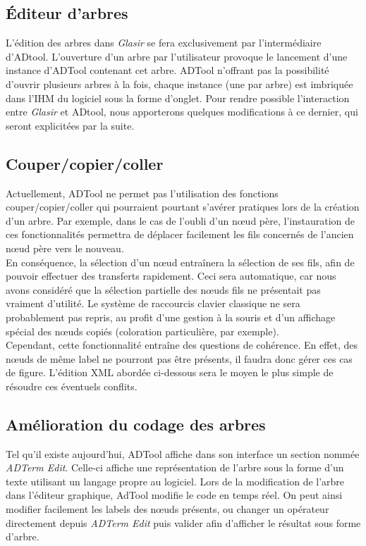 	\subsection{Éditeur d'arbres}

	L'édition des arbres dans \emph{Glasir} se fera exclusivement par l'intermédiaire d'ADtool. L'ouverture d'un arbre par l'utilisateur provoque le lancement d'une instance d'ADTool contenant cet arbre. ADTool n'offrant pas la possibilité d'ouvrir plusieurs arbres à la fois, chaque instance (une par arbre) est imbriquée dans l'IHM du logiciel sous la forme d'onglet. Pour rendre possible l'interaction entre \emph{Glasir} et ADtool, nous apporterons quelques modifications à ce dernier, qui seront explicitées par la suite.

\subsection{Couper/copier/coller}
	
	Actuellement, ADTool ne permet pas l'utilisation des fonctions couper/copier/coller qui pourraient pourtant s'avérer pratiques lors de la création d'un arbre. Par exemple, dans le cas de l'oubli d'un nœud père, l'instauration de ces fonctionnalités permettra de déplacer facilement les fils concernés de l'ancien nœud père vers le nouveau.\\
	En conséquence, la sélection d'un nœud entraînera la sélection de ses fils, afin de pouvoir effectuer des transferts rapidement. Ceci sera automatique, car nous avons considéré que la sélection partielle des nœuds fils ne présentait pas vraiment d'utilité. Le système de raccourcis clavier classique ne sera probablement pas repris, au profit d'une gestion à la souris et d'un affichage spécial des nœuds copiés (coloration particulière, par exemple).\\

	Cependant, cette fonctionnalité entraîne des questions de cohérence. En effet, des nœuds de même label ne pourront pas être présents, il faudra donc gérer ces cas de figure. L'édition XML abordée ci-dessous sera le moyen le plus simple de résoudre ces éventuels conflits.

	\subsection{Amélioration du codage des arbres}

	Tel qu'il existe aujourd'hui, ADTool affiche dans son interface un section nommée \emph{ADTerm Edit}. Celle-ci affiche une représentation de l'arbre sous la forme d'un texte utilisant un langage propre au logiciel. Lors de la modification de l'arbre dans l'éditeur graphique, AdTool modifie le code en temps réel. On peut ainsi modifier facilement les labels des nœuds présents, ou changer un opérateur directement depuis \emph{ADTerm Edit} puis valider afin d'afficher le résultat sous forme d'arbre. 

